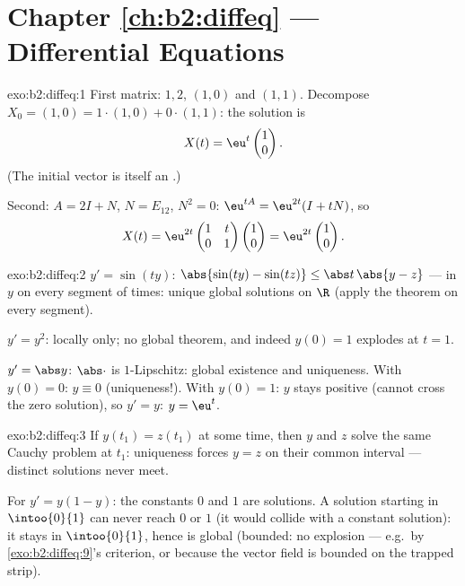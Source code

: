\section*{Chapter \ref{ch:b2:diffeq} --- Differential Equations}

\begin{solution}{exo:b2:diffeq:1}
First matrix:  $1, 2$,  $(1,0)$ and $(1,1)$.
Decompose $X_0 = (1,0) = 1\cdot(1,0) + 0\cdot(1,1)$: the solution
is
\[
X(t) = \eu^{t}\begin{pmatrix}1\\ 0\end{pmatrix} .
\]
(The initial vector is itself an .)

Second: $A = 2I + N$, $N = E_{12}$, $N^2 = 0$: $\eu^{tA} =
\eu^{2t}(I + tN)$, so
\[
X(t) = \eu^{2t}\begin{pmatrix} 1 & t\\ 0 & 1\end{pmatrix}
\begin{pmatrix}1\\ 0\end{pmatrix}
= \eu^{2t}\begin{pmatrix}1\\ 0\end{pmatrix}.
\]
\end{solution}

\begin{solution}{exo:b2:diffeq:2}
$y' = \sin(ty)$: $\abs{\sin(ty) - \sin(tz)} \leq \abs t\,\abs{y -
z}$ ---  in $y$  on every segment of times:
unique global solutions on $\R$ (apply the theorem on every
segment).

$y' = y^2$: locally  only; no global theorem, and indeed
$y(0) = 1$ explodes at $t = 1$.

$y' = \abs y$: $\abs\cdot$ is $1$-Lipschitz: global existence and
uniqueness. With $y(0) = 0$: $y \equiv 0$ (uniqueness!). With $y(0)
= 1$: $y$ stays positive (cannot cross the zero solution), so $y' =
y$: $y = \eu^t$.
\end{solution}

\begin{solution}{exo:b2:diffeq:3}
If $y(t_1) = z(t_1)$ at some time, then $y$ and $z$ solve the same
Cauchy problem at $t_1$: uniqueness forces $y = z$ on their common
interval --- distinct solutions never meet.

For $y' = y(1-y)$: the constants $0$ and $1$ are solutions. A
solution starting in $\intoo{0}{1}$ can never reach $0$ or $1$
(it would collide with a constant solution): it stays in
$\intoo{0}{1}$, hence is global (bounded: no explosion --- e.g.\
by \cref{exo:b2:diffeq:9}'s criterion, or because the vector field
is bounded on the trapped strip).
\end{solution}

